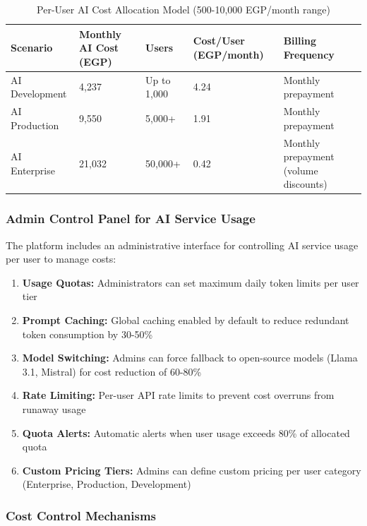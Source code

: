 \documentclass[11pt,a4paper]{article}
\begin{document}
\begin{enumerate}
\begin{table}[H]
\centering
\footnotesize
\begin{tabular}{|l|l|l|l|l|}
\hline
\textbf{Scenario} & \textbf{Monthly AI Cost (EGP)} & \textbf{Users} & \textbf{Cost/User (EGP/month)} & \textbf{Billing Frequency} \\
\hline
AI Development & 4,237 & Up to 1,000 & 4.24 & Monthly prepayment \\
AI Production & 9,550 & 5,000+ & 1.91 & Monthly prepayment \\
AI Enterprise & 21,032 & 50,000+ & 0.42 & Monthly prepayment (volume discounts) \\
\hline
\end{tabular}
\caption{Per-User AI Cost Allocation Model (500-10,000 EGP/month range)}
\end{table}

\subsubsection{Admin Control Panel for AI Service Usage}

The platform includes an administrative interface for controlling AI service usage per user to manage costs:

\begin{enumerate}
    \item \textbf{Usage Quotas:} Administrators can set maximum daily token limits per user tier
    \item \textbf{Prompt Caching:} Global caching enabled by default to reduce redundant token consumption by 30-50\%
    \item \textbf{Model Switching:} Admins can force fallback to open-source models (Llama 3.1, Mistral) for cost reduction of 60-80\%
    \item \textbf{Rate Limiting:} Per-user API rate limits to prevent cost overruns from runaway usage
    \item \textbf{Quota Alerts:} Automatic alerts when user usage exceeds 80\% of allocated quota
    \item \textbf{Custom Pricing Tiers:} Admins can define custom pricing per user category (Enterprise, Production, Development)
\end{enumerate}

\subsubsection{Cost Control Mechanisms}


\end{enumerate}
\end{document}
